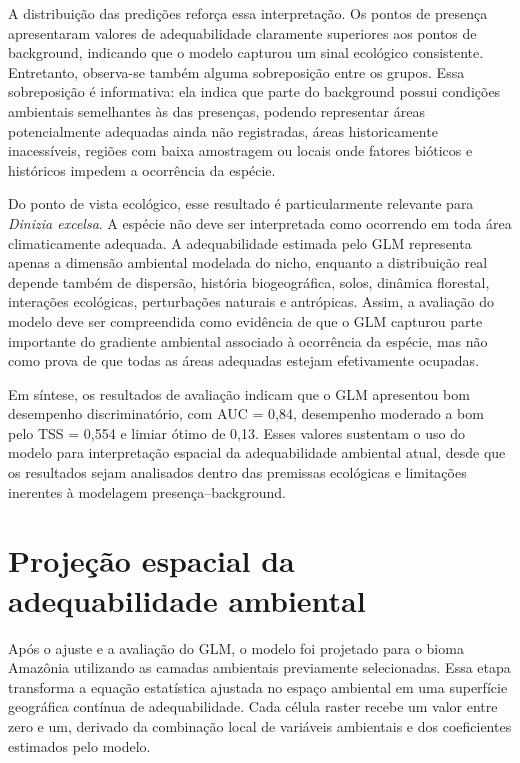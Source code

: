 A distribuição das predições reforça essa interpretação. Os pontos de presença apresentaram valores de adequabilidade claramente superiores aos pontos de background, indicando que o modelo capturou um sinal ecológico consistente. Entretanto, observa-se também alguma sobreposição entre os grupos. Essa sobreposição é informativa: ela indica que parte do background possui condições ambientais semelhantes às das presenças, podendo representar áreas potencialmente adequadas ainda não registradas, áreas historicamente inacessíveis, regiões com baixa amostragem ou locais onde fatores bióticos e históricos impedem a ocorrência da espécie.

Do ponto de vista ecológico, esse resultado é particularmente relevante para \textit{Dinizia excelsa}. A espécie não deve ser interpretada como ocorrendo em toda área climaticamente adequada. A adequabilidade estimada pelo GLM representa apenas a dimensão ambiental modelada do nicho, enquanto a distribuição real depende também de dispersão, história biogeográfica, solos, dinâmica florestal, interações ecológicas, perturbações naturais e antrópicas. Assim, a avaliação do modelo deve ser compreendida como evidência de que o GLM capturou parte importante do gradiente ambiental associado à ocorrência da espécie, mas não como prova de que todas as áreas adequadas estejam efetivamente ocupadas.

Em síntese, os resultados de avaliação indicam que o GLM apresentou bom desempenho discriminatório, com AUC = 0,84, desempenho moderado a bom pelo TSS = 0,554 e limiar ótimo de 0,13. Esses valores sustentam o uso do modelo para interpretação espacial da adequabilidade ambiental atual, desde que os resultados sejam analisados dentro das premissas ecológicas e limitações inerentes à modelagem presença--background.


\section{Projeção espacial da adequabilidade ambiental}

Após o ajuste e a avaliação do GLM, o modelo foi projetado para o bioma Amazônia utilizando as camadas ambientais previamente selecionadas. Essa etapa transforma a equação estatística ajustada no espaço ambiental em uma superfície geográfica contínua de adequabilidade. Cada célula raster recebe um valor entre zero e um, derivado da combinação local de variáveis ambientais e dos coeficientes estimados pelo modelo.

